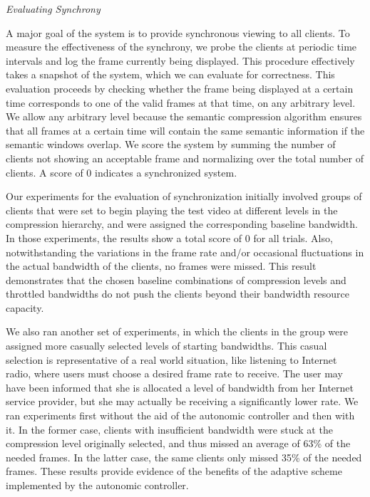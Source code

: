 \documentclass{sig-alternate}
\begin{document}
 

\textit{Evaluating Synchrony}

A major goal of the system is to provide synchronous viewing to all
clients.  To measure the effectiveness of the synchrony, we probe the
clients at periodic time intervals and log the frame currently being
displayed.  This procedure effectively takes a snapshot of the system,
which we can evaluate for correctness.  This evaluation proceeds by
checking whether the frame being displayed at a certain time
corresponds to one of the valid frames at that time, on any arbitrary
level.  We allow any arbitrary level because the semantic compression
algorithm ensures that all frames at a certain time will contain the
same semantic information if the semantic windows overlap.  We score
the system by summing the number of clients not showing an acceptable
frame and normalizing over the total number of clients.  A score of 0
indicates a synchronized system.

Our experiments for the evaluation of synchronization initially
involved groups of clients that were set to begin playing the test
video at different levels in the compression hierarchy, and were
assigned the corresponding baseline bandwidth. In those experiments,
the results show a total score of 0 for all trials. Also,
notwithstanding the variations in the frame rate and/or occasional
fluctuations in the actual bandwidth of the clients, no frames were
missed.  This result demonstrates that the chosen baseline
combinations of compression levels and throttled bandwidths do not
push the clients beyond their bandwidth resource capacity.

We also ran another set of experiments, in which the clients in the
group were assigned more casually selected levels of starting
bandwidths.  This casual selection is representative of a real world
situation, like listening to Internet radio, where users must choose a
desired frame rate to receive.  The user may have been informed that
she is allocated a level of bandwidth from her Internet service
provider, but she may actually be receiving a significantly lower
rate.  We ran experiments first without the aid of the autonomic
controller and then with it. In the former case, clients with
insufficient bandwidth were stuck at the compression level originally
selected, and thus missed an average of 63\% of the needed frames.  In
the latter case, the same clients only missed 35\% of the needed
frames.  These results provide evidence of the benefits of the
adaptive scheme implemented by the autonomic controller.
\end{document}

